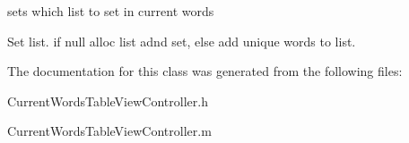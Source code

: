 sets which list to set in current words 

Set list. if null alloc list adnd set, else add unique words to list. 

The documentation for this class was generated from the following files\+:\begin{DoxyCompactItemize}
\item 
Current\+Words\+Table\+View\+Controller.\+h\item 
Current\+Words\+Table\+View\+Controller.\+m\end{DoxyCompactItemize}
